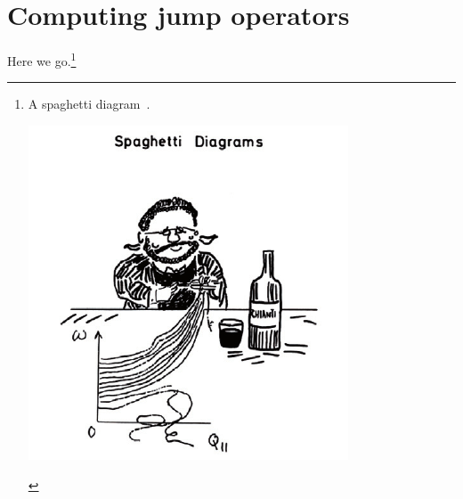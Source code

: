 \documentclass[../thesis.tex]{subfiles}
\begin{document}
\chapter{Computing jump operators}

Here we go.\footnote{%
  A spaghetti diagram~\cite{bernasconiGiorgioBenedekExtraordinary2012}.
  \\
  \begin{center}
    \includegraphics[width=0.25\linewidth]{spaghetti}
  \end{center}
}


\end{document}
